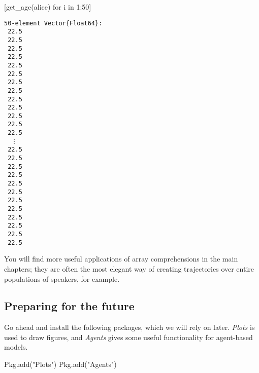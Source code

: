 \documentclass[
  letterpaper,
  DIV=11,
  numbers=noendperiod]{scrartcl}
\newenvironment{Shaded}{\begin{snugshade}}{\end{snugshade}}
\newcommand{\BuiltInTok}[1]{\textcolor[rgb]{0.00,0.23,0.31}{#1}}
\newcommand{\FloatTok}[1]{\textcolor[rgb]{0.68,0.00,0.00}{#1}}
\newcommand{\FunctionTok}[1]{\textcolor[rgb]{0.28,0.35,0.67}{#1}}
\newcommand{\KeywordTok}[1]{\textcolor[rgb]{0.00,0.23,0.31}{#1}}
\newcommand{\NormalTok}[1]{\textcolor[rgb]{0.00,0.23,0.31}{#1}}
\newcommand{\OperatorTok}[1]{\textcolor[rgb]{0.37,0.37,0.37}{#1}}
\newcommand{\StringTok}[1]{\textcolor[rgb]{0.13,0.47,0.30}{#1}}
\begin{document}
\begin{Shaded}
\begin{Highlighting}[]
\NormalTok{[}\FunctionTok{get\_age}\NormalTok{(alice) for i }\KeywordTok{in} \FloatTok{1}\OperatorTok{:}\FloatTok{50}\NormalTok{]}
\end{Highlighting}
\end{Shaded}

\begin{verbatim}
50-element Vector{Float64}:
 22.5
 22.5
 22.5
 22.5
 22.5
 22.5
 22.5
 22.5
 22.5
 22.5
 22.5
 22.5
 22.5
  ⋮
 22.5
 22.5
 22.5
 22.5
 22.5
 22.5
 22.5
 22.5
 22.5
 22.5
 22.5
 22.5
\end{verbatim}

You will find more useful applications of array comprehensions in the
main chapters; they are often the most elegant way of creating
trajectories over entire populations of speakers, for example.

\subsection{Preparing for the future}\label{preparing-for-the-future}

Go ahead and install the following packages, which we will rely on
later. \emph{Plots} is used to draw figures, and \emph{Agents} gives
some useful functionality for agent-based models.

\begin{Shaded}
\begin{Highlighting}[]
\BuiltInTok{Pkg}\NormalTok{.}\FunctionTok{add}\NormalTok{(}\StringTok{"Plots"}\NormalTok{)}
\BuiltInTok{Pkg}\NormalTok{.}\FunctionTok{add}\NormalTok{(}\StringTok{"Agents"}\NormalTok{)}
\end{Highlighting}
\end{Shaded}
\end{document}
